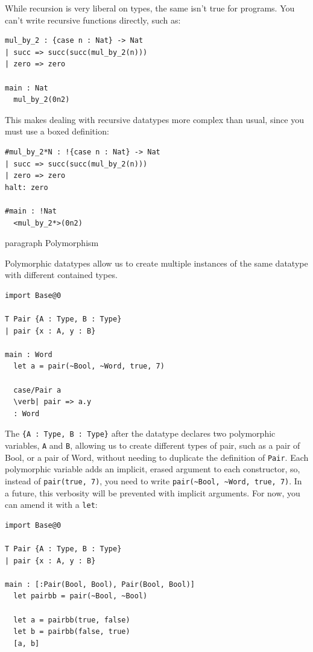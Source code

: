 \documentclass{article}
\theoremstyle{definition}
\theoremstyle{theorem}
\begin{document}
While recursion is very liberal on types, the same isn't true for programs. You
can't write recursive functions directly, such as:

\begin{lstlisting}
mul_by_2 : {case n : Nat} -> Nat
| succ => succ(succ(mul_by_2(n)))
| zero => zero

main : Nat
  mul_by_2(0n2)
\end{lstlisting}

This makes dealing with recursive datatypes more complex than usual, since you
must use a boxed definition:

\begin{lstlisting}
#mul_by_2*N : !{case n : Nat} -> Nat
| succ => succ(succ(mul_by_2(n)))
| zero => zero
halt: zero

#main : !Nat
  <mul_by_2*>(0n2)
\end{lstlisting}

paragraph{ Polymorphism }

Polymorphic datatypes allow us to create multiple instances of the same datatype
with different contained types.

\begin{lstlisting}
import Base@0

T Pair {A : Type, B : Type}
| pair {x : A, y : B}

main : Word
  let a = pair(~Bool, ~Word, true, 7)

  case/Pair a
  \verb| pair => a.y
  : Word
\end{lstlisting}

The \verb|{A : Type, B : Type}| after the datatype declares two polymorphic
variables, \verb|A| and \verb|B|, allowing us to create different types of pair,
such as a pair of Bool, or a pair of Word, without needing to duplicate the
definition of \verb|Pair|. Each polymorphic variable adds an implicit, erased
argument to each constructor, so, instead of \verb|pair(true, 7)|, you need to
write \verb|pair(~Bool, ~Word, true, 7)|. In a future, this verbosity will be
prevented with implicit arguments. For now, you can amend it with a \verb|let|:

\begin{lstlisting}
import Base@0

T Pair {A : Type, B : Type}
| pair {x : A, y : B}

main : [:Pair(Bool, Bool), Pair(Bool, Bool)]
  let pairbb = pair(~Bool, ~Bool)

  let a = pairbb(true, false)
  let b = pairbb(false, true)
  [a, b]
\end{lstlisting}
\end{document}
